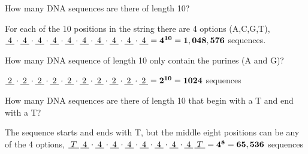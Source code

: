 \begin{questions}

 How many DNA sequences are there of length 10?
    \ifprintanswers
        \vspace{-10pt}
   \fi
    \begin{solution}
    For each of the 10 positions in the string there are 4 options (A,C,G,T), \\
    $\underline{\;4\;} \cdot \underline{\;4\;} \cdot \underline{\;4\;} \cdot \underline{\;4\;} \cdot \underline{\;4\;} \cdot \underline{\;4\;} \cdot
        \underline{\;4\;} \cdot \underline{\;4\;} \cdot \underline{\;4\;} \cdot \underline{\;4\;} = \mathbf{  4^{10}= 1,048,576 }$ sequences.
    \end{solution}





 How many DNA sequence of length 10 only contain the purines (A and G)?
    \ifprintanswers
        \vspace{-10pt}
   \fi
    \begin{solution}
    $ \underline{\;2\;} \cdot \underline{\;2\;} \cdot \underline{\;2\;} \cdot \underline{\;2\;} \cdot \underline{\;2\;}
      \cdot \underline{\;2\;} \cdot \underline{\;2\;} \cdot \underline{\;2\;} \cdot \underline{\;2\;} \cdot \underline{\;2\;} = \mathbf{  2^{10} = 1024}$ sequences
    \end{solution}


 How many DNA sequences are there of length 10 that begin with a T and end with a T?
    \ifprintanswers
        \vspace{-10pt}
   \fi
    \begin{solution}
    The sequence starts and ends with T, but the middle eight positions can be any of the 4 options,
    $ \underline{\;T\;}\, \underline{\;4\;} \cdot \underline{\;4\;} \cdot \underline{\;4\;} \cdot \underline{\;4\;} \cdot \underline{\;4\;} \cdot
        \underline{\;4\;} \cdot \underline{\;4\;} \cdot \underline{\;4\;}\, \underline{\;T\;} =  \mathbf{ 4^{8} = 65,536 } $ sequences
    \end{solution}



\end{questions}
